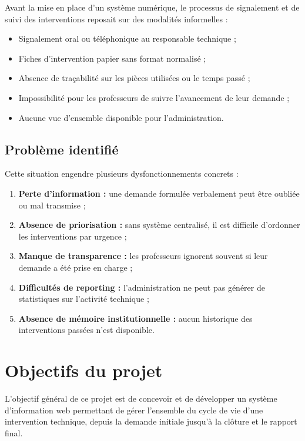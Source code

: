 \documentclass[12pt,a4paper,oneside]{report}
\begin{document}
Avant la mise en place d'un système numérique, le processus de signalement et de suivi des interventions reposait sur des modalités informelles :

\begin{itemize}[leftmargin=2em]
  \item Signalement oral ou téléphonique au responsable technique ;
  \item Fiches d'intervention papier sans format normalisé ;
  \item Absence de traçabilité sur les pièces utilisées ou le temps passé ;
  \item Impossibilité pour les professeurs de suivre l'avancement de leur demande ;
  \item Aucune vue d'ensemble disponible pour l'administration.
\end{itemize}

\subsection{Problème identifié}

Cette situation engendre plusieurs dysfonctionnements concrets :

\begin{enumerate}[leftmargin=2em]
  \item \textbf{Perte d'information :} une demande formulée verbalement peut être oubliée ou mal transmise ;
  \item \textbf{Absence de priorisation :} sans système centralisé, il est difficile d'ordonner les interventions par urgence ;
  \item \textbf{Manque de transparence :} les professeurs ignorent souvent si leur demande a été prise en charge ;
  \item \textbf{Difficultés de reporting :} l'administration ne peut pas générer de statistiques sur l'activité technique ;
  \item \textbf{Absence de mémoire institutionnelle :} aucun historique des interventions passées n'est disponible.
\end{enumerate}

\section{Objectifs du projet}

L'objectif général de ce projet est de concevoir et de développer un système d'information web permettant de gérer l'ensemble du cycle de vie d'une intervention technique, depuis la demande initiale jusqu'à la clôture et le rapport final.
\end{document}
